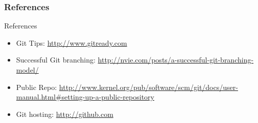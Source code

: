 \documentclass[10pt]{beamer}
\begin{document}
\begin{frame}
    \frametitle{References}
    \begin{block}{References}
        \begin{itemize}
            \item Git Tips: \url{http://www.gitready.com}
            \item Successful Git branching: \url{http://nvie.com/posts/a-successful-git-branching-model/}
            \item Public Repo: \url{http://www.kernel.org/pub/software/scm/git/docs/user-manual.html\#setting-up-a-public-repository}
            \item Git hosting: \url{http://github.com}
        \end{itemize}
    \end{block}
\end{frame}
\end{document}
